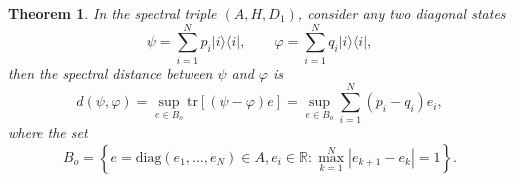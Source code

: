 \documentclass[a4paper,11pt]{article}
\newtheorem{theorem}{Theorem}
\begin{document}
\begin{theorem}\label{th3}
  In the spectral triple $(A, H, D_1)$, consider any two diagonal states
  \begin{equation}\label{pf}
    \psi = \sum_{i = 1}^N p_i |i \rangle \langle i|, \qquad \varphi = \sum_{i
    = 1}^N q_i |i \rangle \langle i|,
  \end{equation}
  then the spectral distance between $\psi$ and $\varphi$ is
  \begin{equation}\label{sd}
    d (\psi, \varphi) = \sup_{e \in B_o} \mathrm{tr} [(\psi - \varphi) e]
    = \sup_{e \in B_o} \sum_{i = 1}^N (p_i - q_i) e_i,
  \end{equation}
  where the set
  \begin{equation}
    B_o = \left\{ e = \mathrm{diag} (e_1, \ldots, e_N) \in A, e_i \in
    \mathbb{R}: \max_{k = 1}^N |e_{k + 1} - e_k | = 1 \right\} .
  \end{equation}
\end{theorem}
\end{document}
